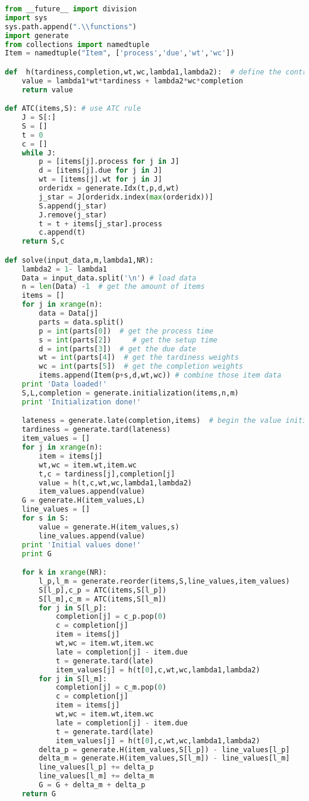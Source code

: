 \begin{lstlisting}[language = Python]
from __future__ import division
import sys
sys.path.append(".\\functions")
import generate
from collections import namedtuple
Item = namedtuple("Item", ['process','due','wt','wc'])

def  h(tardiness,completion,wt,wc,lambda1,lambda2):	 # define the contribution of one item for the obj function
	value = lambda1*wt*tardiness + lambda2*wc*completion
	return value

def ATC(items,S): # use ATC rule
	J = S[:]
	S = []
	t = 0
	c = []
	while J:
		p = [items[j].process for j in J]
		d = [items[j].due for j in J]
		wt = [items[j].wt for j in J]
		orderidx = generate.Idx(t,p,d,wt)
		j_star = J[orderidx.index(max(orderidx))]
		S.append(j_star)
		J.remove(j_star)
		t = t + items[j_star].process
		c.append(t)
	return S,c

def solve(input_data,m,lambda1,NR):
	lambda2 = 1- lambda1
	Data = input_data.split('\n') # load data
	n = len(Data) -1  # get the amount of items
	items = []	
	for j in xrange(n):
		data = Data[j]
		parts = data.split()
		p = int(parts[0])  # get the process time
		s = int(parts[2])	  # get the setup time
		d = int(parts[3])  # get the due date
		wt = int(parts[4])  # get the tardiness weights
		wc = int(parts[5])  # get the completion weights
		items.append(Item(p+s,d,wt,wc)) # combine those item data
	print 'Data loaded!'
	S,L,completion = generate.initialization(items,n,m)
	print 'Initialization done!'

	lateness = generate.late(completion,items)  # begin the value initialization
	tardiness = generate.tard(lateness)
	item_values = []
	for j in xrange(n):
		item = items[j]
		wt,wc = item.wt,item.wc
		t,c = tardiness[j],completion[j]
		value = h(t,c,wt,wc,lambda1,lambda2)
		item_values.append(value)
	G = generate.H(item_values,L)
	line_values = []
	for s in S:
		value = generate.H(item_values,s)
		line_values.append(value)
	print 'Initial values done!'
	print G

	for k in xrange(NR):
		l_p,l_m = generate.reorder(items,S,line_values,item_values)
		S[l_p],c_p = ATC(items,S[l_p])
		S[l_m],c_m = ATC(items,S[l_m])
		for j in S[l_p]:
			completion[j] = c_p.pop(0)
			c = completion[j]
			item = items[j]
			wt,wc = item.wt,item.wc
			late = completion[j] - item.due
			t = generate.tard(late)
			item_values[j] = h(t[0],c,wt,wc,lambda1,lambda2)
		for j in S[l_m]:
			completion[j] = c_m.pop(0)
			c = completion[j]
			item = items[j]
			wt,wc = item.wt,item.wc
			late = completion[j] - item.due
			t = generate.tard(late)
			item_values[j] = h(t[0],c,wt,wc,lambda1,lambda2)
		delta_p = generate.H(item_values,S[l_p]) - line_values[l_p]
		delta_m = generate.H(item_values,S[l_m]) - line_values[l_m]
		line_values[l_p] += delta_p
		line_values[l_m] += delta_m
		G = G + delta_m + delta_p
	return G


\end{lstlisting}
